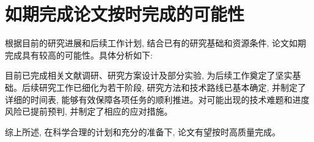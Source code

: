 \section{如期完成论文按时完成的可能性}
根据目前的研究进展和后续工作计划, 结合已有的研究基础和资源条件, 论文如期完成具有较高的可能性。具体分析如下:

目前已完成相关文献调研、研究方案设计及部分实验, 为后续工作奠定了坚实基础。后续研究工作已细化为若干阶段, 研究方法和技术路线已基本确定, 并制定了详细的时间表, 能够有效保障各项任务的顺利推进。对可能出现的技术难题和进度风险已提前预判, 并制定了相应的应对措施。

综上所述, 在科学合理的计划和充分的准备下, 论文有望按时高质量完成。
% 
% 

